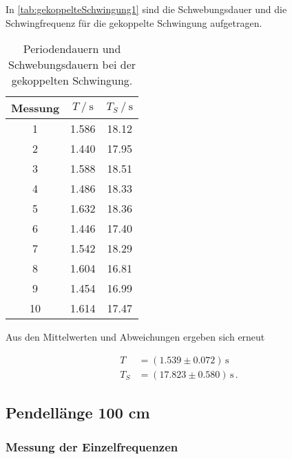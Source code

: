 In \autoref{tab:gekoppelteSchwingung1} sind die Schwebungsdauer und die Schwingfrequenz für die gekoppelte Schwingung aufgetragen.

\begin{table}[H]
  \centering
  \caption{Periodendauern und Schwebungsdauern bei der gekoppelten Schwingung.}
  \label{tab:gekoppelteSchwingung1}
  \begin{tabular}{S[table-format=2.0] S S}
    \toprule
    {Messung} & {$T \mathbin{/} \unit{\second}$} & {$T_S \mathbin{/} \unit{\second}$} \\
     & 1.586 & 18.12 \\
    2 & 1.440 & 17.95 \\
    3 & 1.588 & 18.51 \\
    4 & 1.486 & 18.33 \\
    5 & 1.632 & 18.36 \\
    6 & 1.446 & 17.40 \\
    7 & 1.542 & 18.29 \\
    8 & 1.604 & 16.81 \\
    9 & 1.454 & 16.99 \\
   10 & 1.614 & 17.47 \\
   \bottomrule
  \end{tabular}
\end{table}

Aus den Mittelwerten und Abweichungen ergeben sich erneut

\begin{align*}
 T   &= (1.539  \pm 0.072) \, \unit{\second} \\ 
 T_S &= (17.823 \pm 0.580) \, \unit{\second}\, . 
\end{align*}


\subsection{Pendellänge 100 cm}
\subsubsection{Messung der Einzelfrequenzen}

